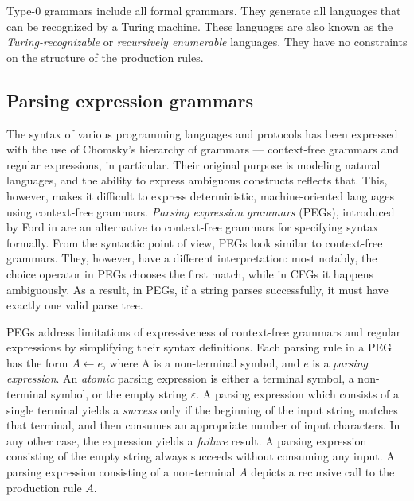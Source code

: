 \documentclass[english,bachelors,forcepolishlogotype]{wizthesis}
\begin{document}
Type-0 grammars include all formal grammars. They generate all languages that
can be recognized by a Turing machine. These languages are also known as the
\emph{Turing-recognizable} or \emph{recursively enumerable} languages. They have
no constraints on the structure of the production rules.

\subsection{Parsing expression grammars} \label{sbs:pegs}

The syntax of various programming languages and protocols has been expressed
with the use of Chomsky's hierarchy of grammars --- context-free grammars and
regular expressions, in particular. Their original purpose is modeling natural
languages, and the ability to express ambiguous constructs reflects that. This,
however, makes it difficult to express deterministic, machine-oriented languages
using context-free grammars. \emph{Parsing expression grammars} (PEGs),
introduced by Ford in \cite{ford-2004} are an alternative to context-free
grammars for specifying syntax formally. From the syntactic point of view, PEGs
look similar to context-free grammars. They, however, have a different
interpretation: most notably, the choice operator in PEGs chooses the first
match, while in CFGs it happens ambiguously. As a result, in PEGs, if a string
parses successfully, it must have exactly one valid parse tree.

PEGs address limitations of expressiveness of context-free grammars and regular
expressions by simplifying their syntax definitions. Each parsing rule in a PEG
has the form $A \leftarrow e$, where A is a non-terminal symbol, and $e$ is a
\emph{parsing expression}. An \emph{atomic} parsing expression is either a
terminal symbol, a non-terminal symbol, or the empty string $\varepsilon$. A
parsing expression which consists of a single terminal yields a \emph{success}
only if the beginning of the input string matches that terminal, and then
consumes an appropriate number of input characters. In any other case, the
expression yields a \emph{failure} result. A parsing expression consisting of
the empty string always succeeds without consuming any input. A parsing
expression consisting of a non-terminal $A$ depicts a recursive call to the
production rule $A$.
\end{document}
